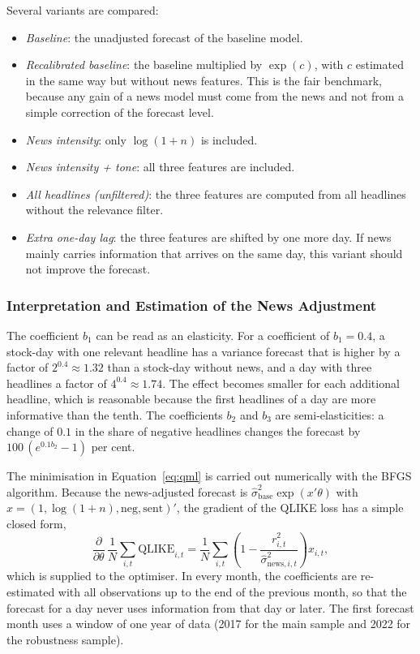 \documentclass[12pt,a4paper]{article}
\begin{document}
Several variants are compared:
\begin{itemize}
  \item \emph{Baseline}: the unadjusted forecast of the baseline model.
  \item \emph{Recalibrated baseline}: the baseline multiplied by $\exp(c)$, with $c$ estimated in the same way but without news features. This is the fair benchmark, because any gain of a news model must come from the news and not from a simple correction of the forecast level.
  \item \emph{News intensity}: only $\log(1+n)$ is included.
  \item \emph{News intensity + tone}: all three features are included.
  \item \emph{All headlines (unfiltered)}: the three features are computed from all headlines without the relevance filter.
  \item \emph{Extra one-day lag}: the three features are shifted by one more day. If news mainly carries information that arrives on the same day, this variant should not improve the forecast.
\end{itemize}

\subsubsection{Interpretation and Estimation of the News Adjustment}\label{sec:news-interpretation}
The coefficient $b_1$ can be read as an elasticity. For a coefficient of $b_1=0.4$, a stock-day with one relevant headline has a variance forecast that is higher by a factor of $2^{0.4}\approx 1.32$ than a stock-day without news, and a day with three headlines a factor of $4^{0.4}\approx 1.74$. The effect becomes smaller for each additional headline, which is reasonable because the first headlines of a day are more informative than the tenth. The coefficients $b_2$ and $b_3$ are semi-elasticities: a change of $0.1$ in the share of negative headlines changes the forecast by $100\,(e^{0.1 b_2}-1)$ per cent.

The minimisation in Equation~\eqref{eq:qml} is carried out numerically with the BFGS algorithm. Because the news-adjusted forecast is $\hat\sigma^2_{\text{base}}\exp(x'\theta)$ with $x=(1,\log(1+n),\text{neg},\text{sent})'$, the gradient of the QLIKE loss has a simple closed form,
\begin{equation}
  \frac{\partial}{\partial\theta}\,\frac{1}{N}\sum_{i,t}\text{QLIKE}_{i,t} = \frac{1}{N}\sum_{i,t}\left(1-\frac{r_{i,t}^2}{\hat\sigma^2_{\text{news},i,t}}\right)x_{i,t},
  \label{eq:gradient}
\end{equation}
which is supplied to the optimiser. In every month, the coefficients are re-estimated with all observations up to the end of the previous month, so that the forecast for a day never uses information from that day or later. The first forecast month uses a window of one year of data (2017 for the main sample and 2022 for the robustness sample).
\end{document}
